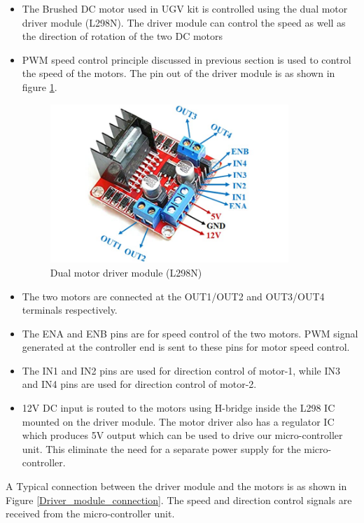 \begin{itemize}
    \item The Brushed DC motor used in UGV kit is controlled using the dual motor driver module (L298N). The driver module can control the speed as well as the direction of rotation of the two DC motors
    \item PWM speed control principle discussed in previous section is used to control the speed of the motors. The pin out of the driver module is as shown in figure \ref{Motor_driver_L298}.
    
    \begin{figure}[h!]
    \centering
    \includegraphics[width=9cm]{./Figures/Motor_driver_L298.jpg}
    \caption{Dual motor driver module (L298N)}
    \label{Motor_driver_L298}
    \end{figure}
    
    \item The two motors are connected at the OUT1/OUT2 and OUT3/OUT4 terminals respectively.
    \item The ENA and ENB pins are for speed control of the two motors. PWM signal generated at the controller end is sent to these pins for motor speed control.
    \item The IN1 and IN2 pins are used for direction control of motor-1, while IN3 and IN4 pins are used for direction control of motor-2.
    \item 12V DC input is routed to the motors using H-bridge inside the L298 IC mounted on the driver module. The motor driver also has a regulator IC which produces 5V output which can be used to drive our micro-controller unit. This eliminate the need for a separate power supply for the micro-controller.
\end{itemize}

A Typical connection between the driver module and the motors is as shown in Figure \ref{Driver_module_connection}. The speed and direction control signals are received from the micro-controller unit.

